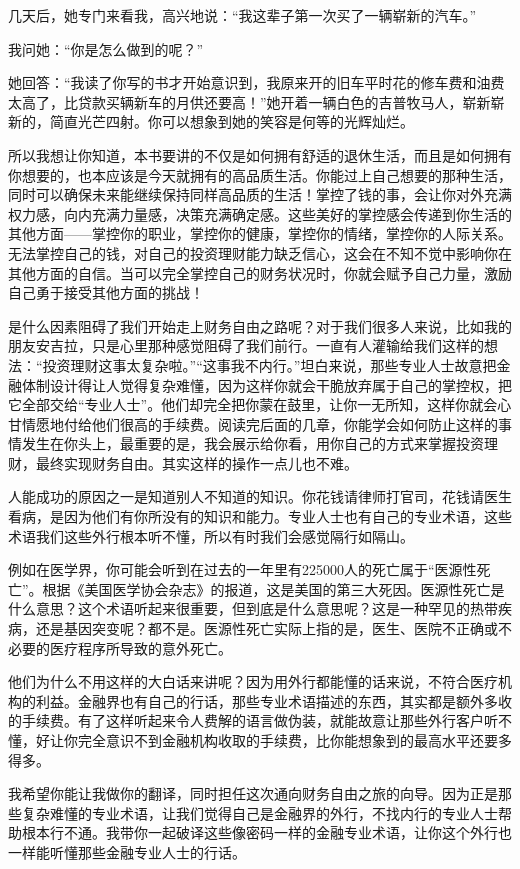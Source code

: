 几天后，她专门来看我，高兴地说：“我这辈子第一次买了一辆崭新的汽车。”

我问她：“你是怎么做到的呢？”

她回答：“我读了你写的书才开始意识到，我原来开的旧车平时花的修车费和油费太高了，比贷款买辆新车的月供还要高！”她开着一辆白色的吉普牧马人，崭新崭新的，简直光芒四射。你可以想象到她的笑容是何等的光辉灿烂。

所以我想让你知道，本书要讲的不仅是如何拥有舒适的退休生活，而且是如何拥有你想要的，也本应该是今天就拥有的高品质生活。你能过上自己想要的那种生活，同时可以确保未来能继续保持同样高品质的生活！掌控了钱的事，会让你对外充满权力感，向内充满力量感，决策充满确定感。这些美好的掌控感会传递到你生活的其他方面——掌控你的职业，掌控你的健康，掌控你的情绪，掌控你的人际关系。无法掌控自己的钱，对自己的投资理财能力缺乏信心，这会在不知不觉中影响你在其他方面的自信。当可以完全掌控自己的财务状况时，你就会赋予自己力量，激励自己勇于接受其他方面的挑战！

是什么因素阻碍了我们开始走上财务自由之路呢？对于我们很多人来说，比如我的朋友安吉拉，只是心里那种感觉阻碍了我们前行。一直有人灌输给我们这样的想法：“投资理财这事太复杂啦。”“这事我不内行。”坦白来说，那些专业人士故意把金融体制设计得让人觉得复杂难懂，因为这样你就会干脆放弃属于自己的掌控权，把它全部交给“专业人士”。他们却完全把你蒙在鼓里，让你一无所知，这样你就会心甘情愿地付给他们很高的手续费。阅读完后面的几章，你能学会如何防止这样的事情发生在你头上，最重要的是，我会展示给你看，用你自己的方式来掌握投资理财，最终实现财务自由。其实这样的操作一点儿也不难。

人能成功的原因之一是知道别人不知道的知识。你花钱请律师打官司，花钱请医生看病，是因为他们有你所没有的知识和能力。专业人士也有自己的专业术语，这些术语我们这些外行根本听不懂，所以有时我们会感觉隔行如隔山。

例如在医学界，你可能会听到在过去的一年里有225000人的死亡属于“医源性死亡”。根据《美国医学协会杂志》的报道，这是美国的第三大死因。医源性死亡是什么意思？这个术语听起来很重要，但到底是什么意思呢？这是一种罕见的热带疾病，还是基因突变呢？都不是。医源性死亡实际上指的是，医生、医院不正确或不必要的医疗程序所导致的意外死亡。

他们为什么不用这样的大白话来讲呢？因为用外行都能懂的话来说，不符合医疗机构的利益。金融界也有自己的行话，那些专业术语描述的东西，其实都是额外多收的手续费。有了这样听起来令人费解的语言做伪装，就能故意让那些外行客户听不懂，好让你完全意识不到金融机构收取的手续费，比你能想象到的最高水平还要多得多。

我希望你能让我做你的翻译，同时担任这次通向财务自由之旅的向导。因为正是那些复杂难懂的专业术语，让我们觉得自己是金融界的外行，不找内行的专业人士帮助根本行不通。我带你一起破译这些像密码一样的金融专业术语，让你这个外行也一样能听懂那些金融专业人士的行话。


